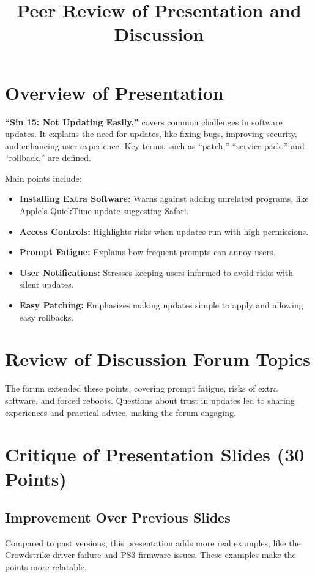 \documentclass{article}
\title{Peer Review of Presentation and Discussion}
\date{}
\begin{document}
\maketitle

\section*{Overview of Presentation}

\textbf{``Sin 15: Not Updating Easily,''} covers common challenges in software updates. It explains the need for updates, like fixing bugs, improving security, and enhancing user experience. Key terms, such as ``patch,'' ``service pack,'' and ``rollback,'' are defined.

Main points include:

\begin{itemize}
    \item \textbf{Installing Extra Software:} Warns against adding unrelated programs, like Apple’s QuickTime update suggesting Safari.
    \item \textbf{Access Controls:} Highlights risks when updates run with high permissions.
    \item \textbf{Prompt Fatigue:} Explains how frequent prompts can annoy users.
    \item \textbf{User Notifications:} Stresses keeping users informed to avoid risks with silent updates.
    \item \textbf{Easy Patching:} Emphasizes making updates simple to apply and allowing easy rollbacks.
\end{itemize}

\section*{Review of Discussion Forum Topics}

The forum extended these points, covering prompt fatigue, risks of extra software, and forced reboots. Questions about trust in updates led to sharing experiences and practical advice, making the forum engaging.

\section*{Critique of Presentation Slides (30 Points)}

\subsection*{Improvement Over Previous Slides}
Compared to past versions, this presentation adds more real examples, like the Crowdstrike driver failure and PS3 firmware issues. These examples make the points more relatable.
\end{document}
